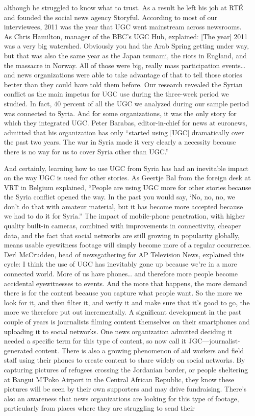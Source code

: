 \begin{enumerate}
although he struggled to know what to trust. As a result he left his job at
RTÉ and founded the social news agency Storyful.
According to most of our interviewees, 2011 was the year that UGC went
mainstream across newsrooms. As Chris Hamilton, manager of the BBC's
UGC Hub, explained:
[The year] 2011 was a very big watershed. Obviously you had the
Arab Spring getting under way, but that was also the same year as
the Japan tsunami, the riots in England, and the massacre in Norway.
All of those were big, really mass participation events… and news
organizations were able to take advantage of that to tell those stories
better than they could have told them before.
Our research revealed the Syrian conflict as the main impetus for UGC use
during the three-week period we studied. In fact, 40 percent of all the UGC
we analyzed during our sample period was connected to Syria. And for
some organizations, it was the only story for which they integrated UGC.
Peter Barabas, editor-in-chief for news at euronews, admitted that his organization
has only ``started using [UGC] dramatically over the past two years.
The war in Syria made it very clearly a necessity because there is no way for
us to cover Syria other than UGC.''

And certainly, learning how to use UGC from Syria has had an inevitable
impact on the way UGC is used for other stories. As Geertje Bal from the
foreign desk at VRT in Belgium explained, ``People are using UGC more
for other stories because the Syria conflict opened the way. In the past you
would say, ‘No, no, no, we don't do that with amateur material, but it has
become more accepted because we had to do it for Syria.''
The impact of mobile-phone penetration, with higher quality built-in cameras,
combined with improvements in connectivity, cheaper data, and the
fact that social networks are still growing in popularity globally, means
usable eyewitness footage will simply become more of a regular occurrence.
Derl McCrudden, head of newsgathering for AP Television News, explained
this cycle:
I think the use of UGC has inevitably gone up because we're in a more
connected world. More of us have phones… and therefore more people
become accidental eyewitnesses to events. And the more that
happens, the more demand there is for the content because you capture
what people want. So the more we look for it, and then filter it,
and verify it and make sure that it's good to go, the more we therefore
put out incrementally.
A significant development in the past couple of years is journalists filming
content themselves on their smartphones and uploading it to social networks.
One news organization admitted deciding it needed a specific term
for this type of content, so now call it JGC—journalist-generated content.
There is also a growing phenomenon of aid workers and field staff using their
phones to create content to share widely on social networks. By capturing
pictures of refugees crossing the Jordanian border, or people sheltering at
Bangui M'Poko Airport in the Central African Republic, they know these
pictures will be seen by their own supporters and may drive fundraising.
There's also an awareness that news organizations are looking for this type
of footage, particularly from places where they are struggling to send their


\end{enumerate}
